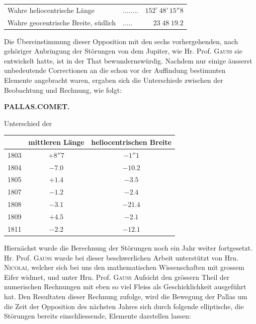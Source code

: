 \begin{center}\fontsize{10}{12}\selectfont\setlength{\tabcolsep}{4pt}\renewcommand{\arraystretch}{1.15}\begin{tabular}{llr}
Wahre heliocentrische Länge & .\;.\;.\;.\;.\;.\;.\;. & $152^\circ\,48'\,15''8$\\
Wahre geocentrische Breite, südlich & .\;.\;.\;.\;. & $23\;48\;19.2$\\
\end{tabular}\end{center}

\par\indent Die Übereinstimmung dieser Opposition mit den sechs vorhergehenden, nach gehöriger Anbringung der Störungen von dem Jupiter, wie Hr. Prof. \textsc{Gauss} sie entwickelt hatte, ist in der That bewundernswürdig. Nachdem nur einige äusserst unbedeutende Correctionen an die schon vor der Auffindung bestimmten Elemente angebracht waren, ergaben sich die Unterschiede zwischen der Beobachtung und Rechnung, wie folgt:
\clearpage
\thispagestyle{empty}
\noindent{}%
\makebox[12mm][l]{}%
\parbox[t]{\dimexpr\linewidth-24mm\relax}{\centering\footnotesize\bfseries PALLAS.\quad COMET.\par}%
\par\nobreak\medskip
\begin{center}\fontsize{10}{12}\selectfont\setlength{\tabcolsep}{4pt}\renewcommand{\arraystretch}{1.15}
Unterschied der

\begin{tabular}{c|c|c}
 & mittleren Länge & heliocentrischen Breite \\
\hline
1803 & $+8''7$ & $-1''1$ \\
1804 & $-7.0$ & $-10.2$ \\
1805 & $+1.4$ & $-3.5$ \\
1807 & $-1.2$ & $-2.4$ \\
1808 & $-3.1$ & $-21.4$ \\
1809 & $+4.5$ & $-2.1$ \\
1811 & $-2.2$ & $-12.1$ \\
\end{tabular}
\end{center}


\par\indent Hiernächst wurde die Berechnung der Störungen noch ein Jahr weiter fortgesetzt. Hr. Prof. \textsc{Gauss} wurde bei dieser beschwerlichen Arbeit unterstützt von Hrn. \textsc{Nicolai}, welcher sich bei uns den mathematischen Wissenschaften mit grossem Eifer widmet, und unter Hrn. Prof. \textsc{Gauss} Aufsicht den grössern Theil der numerischen Rechnungen mit eben so viel Fleiss als Geschicklichkeit ausgeführt hat. Den Resultaten dieser Rechnung zufolge, wird die Bewegung der Pallas um die Zeit der Opposition des nächsten Jahres sich durch folgende elliptische, die Störungen bereits einschliessende, Elemente darstellen lassen:

